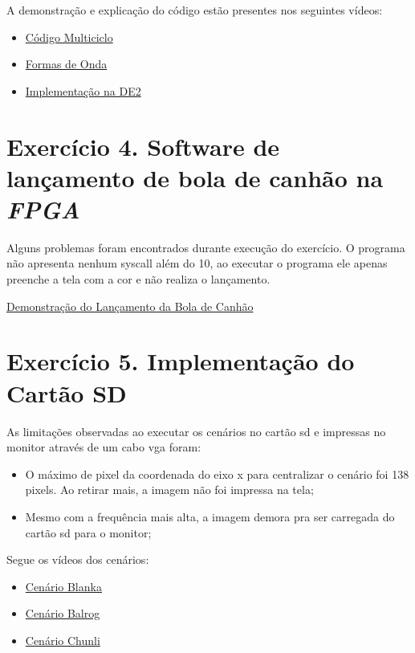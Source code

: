 \documentclass[12pt]{article}
\begin{document}
A demonstração e explicação do código estão presentes nos seguintes vídeos:

\begin{itemize}
\item \href{https://youtu.be/byjAeoPzvlc}{Código Multiciclo}
\item \href{https://youtu.be/1yfLxiZ4ztI}{Formas de Onda}
\item \href{https://youtu.be/0KF8iVj7nfM}{Implementação na DE2} 
\end{itemize}


\section{Exercício 4. Software de lançamento de bola de canhão na \textit{FPGA}}
\label{sec:canhao}

Alguns problemas foram encontrados durante execução do exercício. O programa não apresenta nenhum syscall além do 10, ao executar o programa ele apenas preenche a tela com a cor e não realiza o lançamento.

\href{https://youtu.be/KM9j9fGKz6c}{Demonstração do Lançamento da Bola de Canhão}


\section{Exercício 5. Implementação do Cartão SD}
\label{sec:cartaosd}

As limitações observadas ao executar os cenários no cartão sd e impressas no monitor através de um cabo vga foram:

\begin{itemize}
\item O máximo de pixel da coordenada do eixo x para centralizar o cenário foi 138 pixels. Ao retirar mais, a imagem não foi impressa na tela;
\item Mesmo com a frequência mais alta, a imagem demora pra ser carregada do cartão sd para o monitor;
\end{itemize} 

Segue os vídeos dos cenários:

\begin{itemize}
\item \href{https://youtu.be/a2omO8XZJIs}{Cenário Blanka}
\item \href{https://youtu.be/1NFspVSaYR4}{Cenário Balrog}
\item \href{https://youtu.be/9PXeOKTCW-Y}{Cenário Chunli}

\end{itemize}
\end{document}

